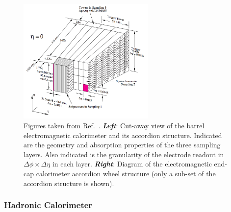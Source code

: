 \begin{figure}[!htb]
    \begin{center}
        \includegraphics[width=0.6\textwidth]{figures/chapter2/calorimeters/atlas_em_calo_barrel}
        \caption{
            Figures taken from Ref.~\cite{CERN-LHCC-96-041}.
            \textbf{\textit{Left}}: Cut-away view of the barrel electromagnetic calorimeter and its accordion
                structure. Indicated are
                the geometry and absorption properties of the three sampling layers.
                Also indicated is the granularity of the electrode readout in $\Delta \phi \times \Delta \eta$
                in each layer.
            \textbf{\textit{Right}}: Diagram of the electromagnetic end-cap calorimeter accordion wheel structure
                (only a sub-set of the accordion structure is shown).
        }
        \label{fig:em_calo_section}
    \end{center}
\end{figure}

\FloatBarrier
\subsubsection{Hadronic Calorimeter}
\label{sec:calo_had}

